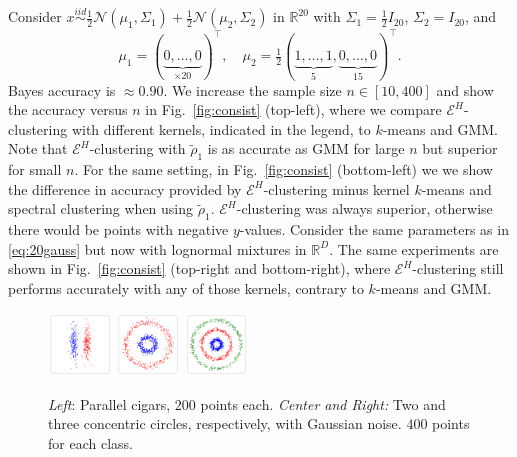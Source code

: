 \documentclass{article}
\begin{document}
Consider
$x \stackrel{iid}{\sim} \tfrac{1}{2} \mathcal{N}(\mu_1,\Sigma_1)+
\tfrac{1}{2} \mathcal{N}(\mu_2, \Sigma_2)$ in $\mathbb{R}^{20}$ with 
$\Sigma_1=\tfrac{1}{2} I_{20}$, $\Sigma_2 = I_{20}$, and
\begin{equation}
\label{eq:20gauss}
\mu_1 = (\underbrace{0,\dotsc,0}_{\times 20})^\top ,\quad
\mu_2 = \tfrac{1}{2} 
(\underbrace{1,\dotsc,1}_{5},\underbrace{0,\dotsc,0}_{15})^\top.
\end{equation}
Bayes accuracy is $\approx 0.90$. 
We increase the sample size $n \in [10, 400]$ and show
the accuracy versus $n$ in Fig.~\ref{fig:consist} (top-left), where we compare
$\mathcal{E}^H$-clustering with different
kernels, indicated in the legend, to $k$-means and GMM.
Note that $\mathcal{E}^H$-clustering
with $\widetilde{\rho}_1$ is as accurate as GMM for large $n$ but
superior for small $n$. For
the same setting, in Fig.~\ref{fig:consist} (bottom-left) we
we show the difference in accuracy provided by $\mathcal{E}^H$-clustering minus
kernel $k$-means and spectral clustering when using $\widetilde{\rho}_1$.
$\mathcal{E}^H$-clustering was
always superior, otherwise there would be points with negative $y$-values.
Consider the same parameters as in \eqref{eq:20gauss} but now with
lognormal mixtures in $\mathbb{R}^D$.
The same experiments are shown in 
Fig.~\ref{fig:consist} (top-right and bottom-right), where
$\mathcal{E}^H$-clustering still performs accurately 
with any of those
kernels, contrary to $k$-means and GMM. 

\begin{figure}[b!]
\centering
\includegraphics[width=0.15\textwidth]{2cigars.pdf}
\includegraphics[width=0.15\textwidth]{2circles.pdf}
\includegraphics[width=0.15\textwidth]{3circles.pdf}
\caption{\label{fig:other}
\emph{Left}: Parallel cigars, $200$ points each. \emph{Center and Right:}
Two and three concentric circles, respectively,
with Gaussian noise. $400$ points for each class.
}
\end{figure}
\end{document}
